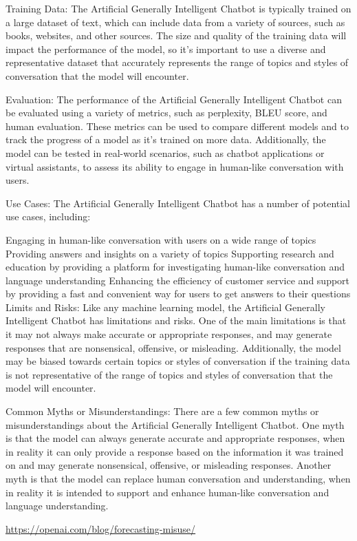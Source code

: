 Training Data:
The Artificial Generally Intelligent Chatbot is typically trained on a large dataset of text, which can include data from a variety of sources, such as books, websites, and other sources. The size and quality of the training data will impact the performance of the model, so it's important to use a diverse and representative dataset that accurately represents the range of topics and styles of conversation that the model will encounter.

Evaluation:
The performance of the Artificial Generally Intelligent Chatbot can be evaluated using a variety of metrics, such as perplexity, BLEU score, and human evaluation. These metrics can be used to compare different models and to track the progress of a model as it's trained on more data. Additionally, the model can be tested in real-world scenarios, such as chatbot applications or virtual assistants, to assess its ability to engage in human-like conversation with users.

Use Cases:
The Artificial Generally Intelligent Chatbot has a number of potential use cases, including:

Engaging in human-like conversation with users on a wide range of topics
Providing answers and insights on a variety of topics
Supporting research and education by providing a platform for investigating human-like conversation and language understanding
Enhancing the efficiency of customer service and support by providing a fast and convenient way for users to get answers to their questions
Limits and Risks:
Like any machine learning model, the Artificial Generally Intelligent Chatbot has limitations and risks. One of the main limitations is that it may not always make accurate or appropriate responses, and may generate responses that are nonsensical, offensive, or misleading. Additionally, the model may be biased towards certain topics or styles of conversation if the training data is not representative of the range of topics and styles of conversation that the model will encounter.

Common Myths or Misunderstandings:
There are a few common myths or misunderstandings about the Artificial Generally Intelligent Chatbot. One myth is that the model can always generate accurate and appropriate responses, when in reality it can only provide a response based on the information it was trained on and may generate nonsensical, offensive, or misleading responses. Another myth is that the model can replace human conversation and understanding, when in reality it is intended to support and enhance human-like conversation and language understanding.

\url{https://openai.com/blog/forecasting-misuse/}

